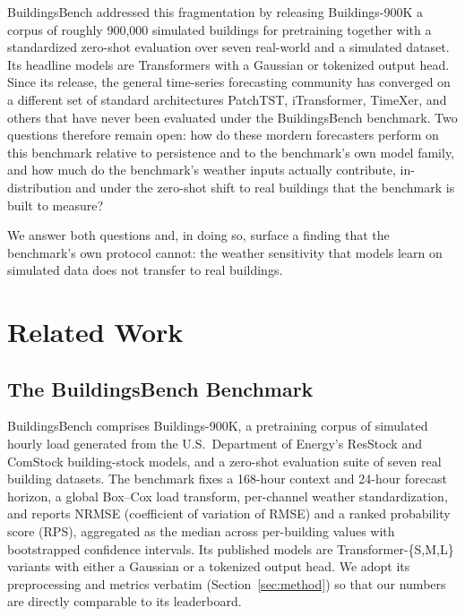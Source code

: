 \documentclass[11pt]{article}
\begin{document}
BuildingsBench \citep{buildingsbench2023} addressed this fragmentation by releasing
Buildings-900K a corpus of roughly 900{,}000 simulated buildings for
pretraining together with a standardized zero-shot evaluation over seven
real-world and a simulated dataset. Its headline
models are Transformers with a Gaussian or tokenized output head.
Since its release, the general time-series forecasting community has
converged on a different set of standard architectures PatchTST, iTransformer,
TimeXer, and others that have never been evaluated under the BuildingsBench benchmark. Two questions therefore remain open: how do these mordern 
forecasters perform on this benchmark relative to persistence and to the
benchmark's own model family, and how much do the benchmark's weather inputs
actually contribute, in-distribution and under the zero-shot shift to real
buildings that the benchmark is built to measure?

We answer both questions and, in doing so, surface a finding that the benchmark's
own protocol cannot: the weather sensitivity that models learn on simulated data
does not transfer to real buildings. 


\section{Related Work}
\label{sec:related}

\subsection{The BuildingsBench Benchmark}
\label{sec:related-bb}
BuildingsBench \citep{buildingsbench2023} comprises Buildings-900K, a pretraining
corpus of simulated hourly load generated from the U.S.\ Department of Energy's
ResStock and ComStock building-stock models, and a zero-shot evaluation suite of
seven real building datasets. The benchmark fixes a 168-hour context and 24-hour
forecast horizon, a global Box--Cox load transform, per-channel weather
standardization, and reports NRMSE (coefficient of variation of RMSE) and a ranked
probability score (RPS), aggregated as the median across per-building values with
bootstrapped confidence intervals. Its published models are Transformer-\{S,M,L\}
variants with either a Gaussian or a tokenized output head. We adopt its
preprocessing and metrics verbatim (Section~\ref{sec:method}) so that our numbers
are directly comparable to its leaderboard.
\end{document}

